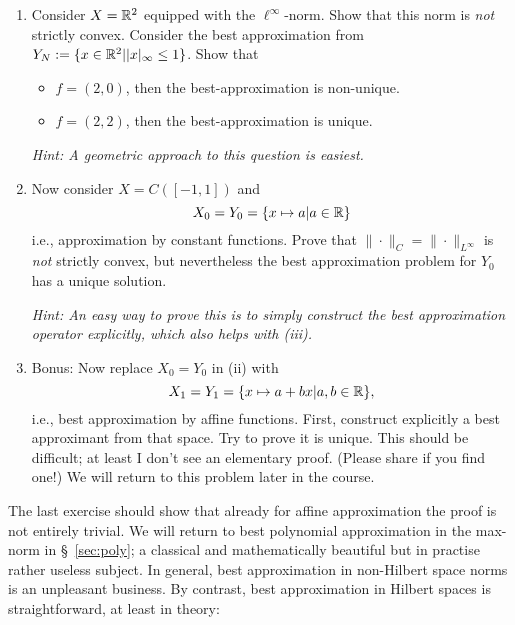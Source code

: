 \begin{exercise}
  \label{exr:prelims:bestapprox_maxnorms}
  \begin{enumerate}\ilist
  \item Consider $X = \mathbb{R}^2$ equipped with the $\ell^\infty$-norm. Show that
  this norm is {\em not} strictly convex. Consider the best approximation
  from $Y_N := \{ x \in \mathbb{R}^2 | |x|_\infty \leq 1 \}$. Show that
  \begin{itemize}
    \item $f = (2, 0)$, then the best-approximation is non-unique.
    \item $f = (2,2)$, then the best-approximation is unique.
  \end{itemize}
  {\it Hint: A geometric approach to this question is easiest. }

  \item Now consider $X = C([-1,1])$ and
  \[
    X_0 = Y_0 = \{ x \mapsto a | a \in \mathbb{R} \}
  \]
  i.e., approximation by constant functions. Prove that $\|\cdot\|_C =
  \|\cdot\|_{L^\infty}$ is {\em not} strictly convex, but nevertheless the best
  approximation problem for $Y_0$ has a unique solution.

  {\it Hint: An easy way to prove this is
  to simply construct the best approximation operator explicitly, which also
  helps with (iii).}

  \item {Bonus: } Now replace $X_0 = Y_0$ in (ii) with 
  \[
      X_1 = Y_1 = \{ x \mapsto a + bx | a,b \in \mathbb{R} \},
  \]
  i.e., best approximation by affine functions. First, construct explicitly a 
  best approximant from that space. Try to prove it is unique. This should 
  be difficult; at least I don't see an elementary proof. (Please share if 
   you find one!)  We will return to this problem later in the course. \qedhere
  \end{enumerate}
\end{exercise}

The last exercise should show that already for affine approximation the proof is not entirely trivial. We will return to best polynomial approximation in the max-norm in \S~\ref{sec:poly}; a classical and mathematically beautiful but in practise rather useless subject. In general, best approximation in non-Hilbert space norms is an unpleasant business. By contrast, best approximation in Hilbert spaces is straightforward, at least in theory: 

